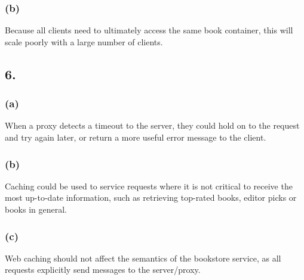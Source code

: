 \documentclass[12pt]{article}
\begin{document}
\subsubsection*{(b)} %

Because all clients need to ultimately access the same book container, this will scale poorly with a large number of clients.

\subsection*{6.} %

\subsubsection*{(a)} %

When a proxy detects a timeout to the server, they could hold on to the request and try again later, or return a more useful error message to the client.

\subsubsection*{(b)} %

Caching could be used to service requests where it is not critical to receive the most up-to-date information, such as retrieving top-rated books, editor picks or books in general.

\subsubsection*{(c)} %

Web caching should not affect the semantics of the bookstore service, as all requests explicitly send messages to the server/proxy.
\end{document}
